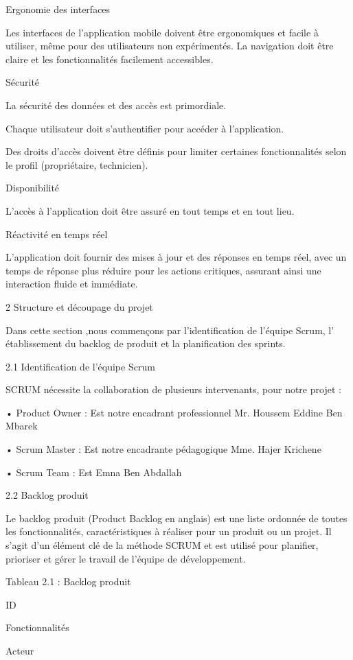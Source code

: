 \documentclass{article}
\begin{document}
Ergonomie des interfaces

Les interfaces de l’application mobile doivent être ergonomiques et facile à utiliser, même pour des utilisateurs non expérimentés. La navigation doit être claire et les fonctionnalités facilement accessibles.

Sécurité

La sécurité des données et des accès est primordiale.

Chaque utilisateur doit s’authentifier pour accéder à l’application.

Des droits d’accès doivent être définis pour limiter certaines fonctionnalités selon le profil (propriétaire, technicien).

Disponibilité

L’accès à l’application doit être assuré en tout temps et en tout lieu.

Réactivité en temps réel

L’application doit fournir des mises à jour et des réponses en temps réel, avec un temps de réponse plus réduire pour les actions critiques, assurant ainsi une interaction fluide et immédiate.

2 Structure et découpage du projet

Dans cette section ,nous commençons par l’identification de l’équipe Scrum, l’ établissement du backlog de produit et la planification des sprints.

2.1 Identification de l’équipe Scrum

SCRUM nécessite la collaboration de plusieurs intervenants, pour notre projet :

• Product Owner : Est notre encadrant professionnel Mr. Houssem Eddine Ben Mbarek 

• Scrum Master : Est notre encadrante pédagogique Mme. Hajer  Krichene 

• Scrum Team : Est Emna Ben Abdallah

2.2 Backlog produit 

Le backlog  produit (Product Backlog en anglais) est une liste ordonnée de toutes les fonctionnalités, caractéristiques  à réaliser pour un produit ou un projet. Il s’agit d’un élément clé de la méthode SCRUM et  est  utilisé  pour  planifier, prioriser et gérer le travail de l’équipe de développement.

Tableau 2.1 : Backlog produit

ID 

Fonctionnalités

Acteur
\end{document}
